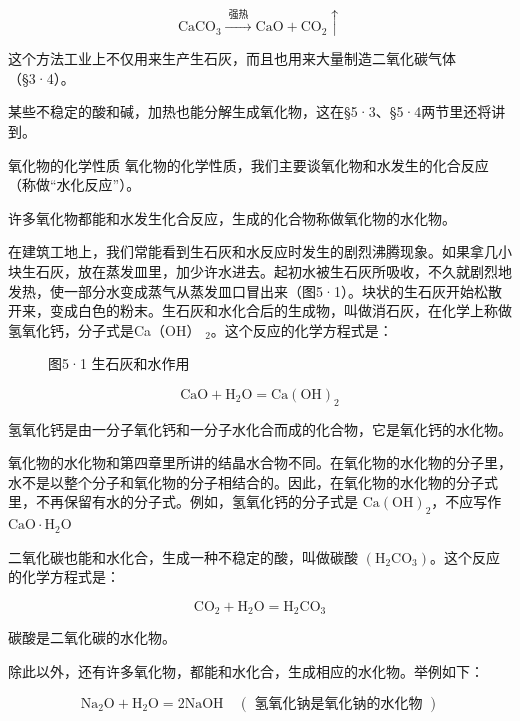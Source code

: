 \[
\mathrm{CaCO}_{3} \xrightarrow {\text{ 强热 }} \mathrm{CaO} + \mathrm{CO}_{2} \uparrow
\]

这个方法工业上不仅用来生产生石灰，而且也用来大量制造二氧化碳气体（§3·4）。

某些不稳定的酸和碱，加热也能分解生成氧化物，这在§5·3、§5·4两节里还将讲到。

氧化物的化学性质
氧化物的化学性质，我们主要谈氧化物和水发生的化合反应（称做``水化反应''）。

许多氧化物都能和水发生化合反应，生成的化合物称做氧化物的水化物。

在建筑工地上，我们常能看到生石灰和水反应时发生的剧烈沸腾现象。如果拿几小块生石灰，放在蒸发皿里，加少许水进去。起初水被生石灰所吸收，不久就剧烈地发热，使一部分水变成蒸气从蒸发皿口冒出来（图5·1）。块状的生石灰开始松散开来，变成白色的粉末。生石灰和水化合后的生成物，叫做消石灰，在化学上称做氢氧化钙，分子式是Ca（OH）
\(_{2}\)。这个反应的化学方程式是：

\begin{figure}
\centering
\caption{图5·1 生石灰和水作用}
\end{figure}

\[
\mathrm{CaO} + \mathrm{H}_{2} \mathrm{O} = \mathrm{Ca(OH)}_{2}
\]

氢氧化钙是由一分子氧化钙和一分子水化合而成的化合物，它是氧化钙的水化物。

氧化物的水化物和第四章里所讲的结晶水合物不同。在氧化物的水化物的分子里，水不是以整个分子和氧化物的分子相结合的。因此，在氧化物的水化物的分子式里，不再保留有水的分子式。例如，氢氧化钙的分子式是
\(\mathrm{Ca(OH)}_2\)，不应写作
\(\mathrm{CaO}\cdot \mathrm{H}_2\mathrm{O}\)

二氧化碳也能和水化合，生成一种不稳定的酸，叫做碳酸
\(\left(\mathrm{H}_{2}\mathrm{CO}_{3}\right)\)。这个反应的化学方程式是：

\[
\mathrm{CO}_{2} + \mathrm{H}_{2} \mathrm{O} = \mathrm{H}_{2} \mathrm{CO}_{3}
\]

碳酸是二氧化碳的水化物。

除此以外，还有许多氧化物，都能和水化合，生成相应的水化物。举例如下：

\[
\mathrm{Na}_{2} \mathrm{O} + \mathrm{H}_{2} \mathrm{O} = 2 \mathrm{NaOH} \quad (\text{ 氢氧化钠是氧化钠的水化物 })
\]

